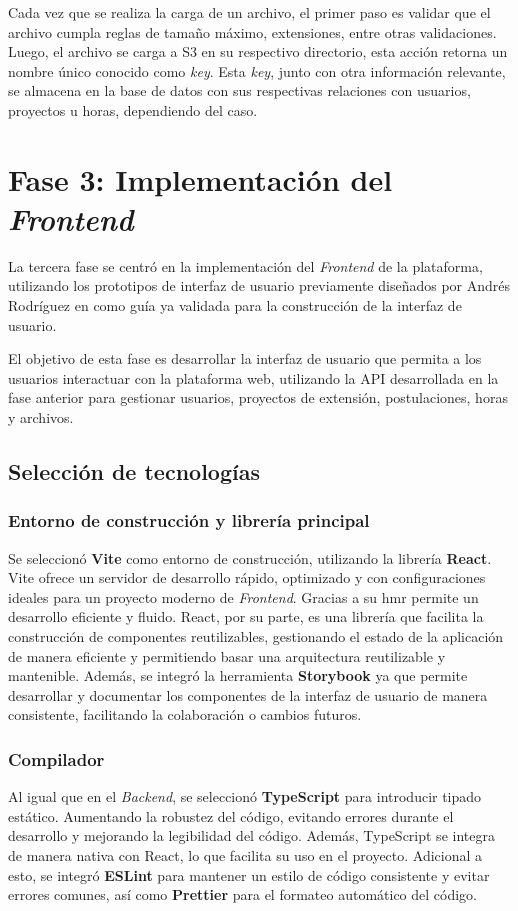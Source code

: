 Cada vez que se realiza la carga de un archivo, el primer paso es validar que el archivo cumpla reglas de tamaño 
máximo, extensiones, entre otras validaciones. Luego, el archivo se carga a S3 en su respectivo directorio, esta acción retorna 
un nombre único conocido como \textit{key}. Esta \textit{key}, junto con otra información relevante, se almacena en la base de 
datos con sus respectivas relaciones con usuarios, proyectos u horas, dependiendo del caso.

\section{Fase 3: Implementación del \textit{Frontend}}

La tercera fase se centró en la implementación del \textit{Frontend} de la plataforma, utilizando los prototipos de interfaz de
usuario previamente diseñados por Andrés Rodríguez en \cite{Rodríguez_Dis_2023} como guía ya validada para la construcción de la
interfaz de usuario.

El objetivo de esta fase es desarrollar la interfaz de usuario que permita a los usuarios interactuar con la plataforma web,
utilizando la API desarrollada en la fase anterior para gestionar usuarios, proyectos de extensión, postulaciones, horas y archivos.

\subsection{Selección de tecnologías}

\subsubsection{Entorno de construcción y librería principal}
Se seleccionó \textbf{Vite} como entorno de construcción, utilizando la librería \textbf{React}. Vite ofrece un servidor de
desarrollo rápido, optimizado y con configuraciones ideales para un proyecto moderno de \textit{Frontend}. Gracias a su
\gls{hmr} permite un desarrollo eficiente y fluido. React, por su parte, es una librería que facilita la construcción de
componentes reutilizables, gestionando el estado de la aplicación de manera eficiente y permitiendo basar una arquitectura
reutilizable y mantenible. Además, se integró la herramienta \textbf{Storybook} ya que permite desarrollar y documentar los
componentes de la interfaz de usuario de manera consistente, facilitando la colaboración o cambios futuros.

\subsubsection{Compilador}
Al igual que en el \textit{Backend}, se seleccionó \textbf{TypeScript} para introducir tipado estático. Aumentando la
robustez del código, evitando errores durante el desarrollo y mejorando la legibilidad del código. Además, TypeScript
se integra de manera nativa con React, lo que facilita su uso en el proyecto. Adicional a esto, se integró \textbf{ESLint}
para mantener un estilo de código consistente y evitar errores comunes, así como \textbf{Prettier} para el formateo
automático del código.

